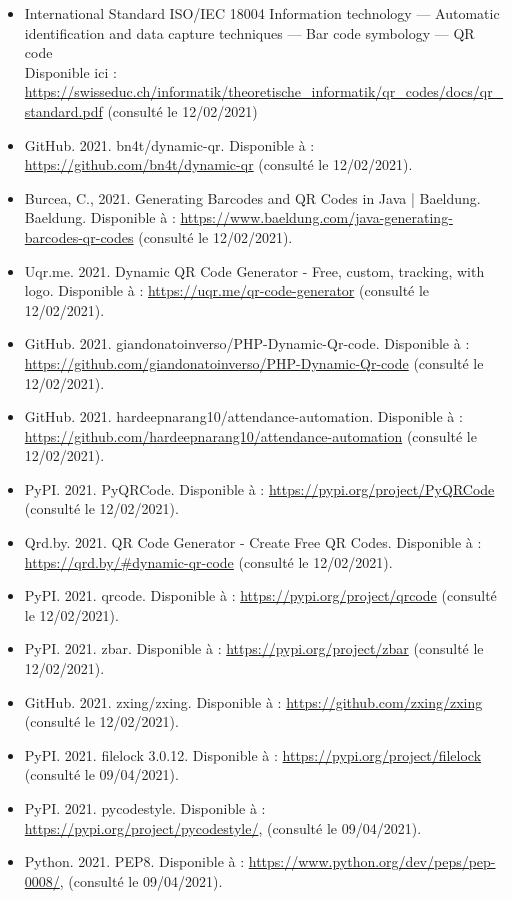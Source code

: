 \documentclass[a4paper,12pt]{article}
\begin{document}
\begin{itemize}

\item International Standard ISO/IEC 18004
Information technology — Automatic identification and data capture techniques — Bar code symbology — QR code\\
Disponible ici : \url{https://swisseduc.ch/informatik/theoretische\_informatik/qr\_codes/docs/qr\_standard.pdf} (consulté le 12/02/2021) \\

\item GitHub. 2021. bn4t/dynamic-qr. Disponible à : \url{https://github.com/bn4t/dynamic-qr} (consulté le 12/02/2021).\\
\item Burcea, C., 2021. Generating Barcodes and QR Codes in Java | Baeldung. Baeldung. Disponible à : \url{https://www.baeldung.com/java-generating-barcodes-qr-codes} (consulté le 12/02/2021).\\
\item Uqr.me. 2021. Dynamic QR Code Generator - Free, custom, tracking, with logo. Disponible à : \url{https://uqr.me/qr-code-generator} (consulté le 12/02/2021).\\
\item GitHub. 2021. giandonatoinverso/PHP-Dynamic-Qr-code. Disponible à : \url{https://github.com/giandonatoinverso/PHP-Dynamic-Qr-code} (consulté le 12/02/2021).\\
\item GitHub. 2021. hardeepnarang10/attendance-automation. Disponible à : \url{https://github.com/hardeepnarang10/attendance-automation} (consulté le 12/02/2021).\\
\item PyPI. 2021. PyQRCode. Disponible à : \url{https://pypi.org/project/PyQRCode} (consulté le 12/02/2021).\\
\item Qrd.by. 2021. QR Code Generator - Create Free QR Codes. Disponible à : \url{https://qrd.by/#dynamic-qr-code} (consulté le 12/02/2021).\\
\item PyPI. 2021. qrcode. Disponible à : \url{https://pypi.org/project/qrcode} (consulté le 12/02/2021).\\
\item PyPI. 2021. zbar. Disponible à : \url{https://pypi.org/project/zbar} (consulté le 12/02/2021).\\
\item GitHub. 2021. zxing/zxing. Disponible à : \url{https://github.com/zxing/zxing} (consulté le 12/02/2021).\\
\item PyPI. 2021. filelock 3.0.12. Disponible à : \url{https://pypi.org/project/filelock} (consulté le 09/04/2021).\\
\item PyPI. 2021. pycodestyle. Disponible à : \url{https://pypi.org/project/pycodestyle/}, (consulté le 09/04/2021).\\
\item Python. 2021. PEP8. Disponible à : \url{https://www.python.org/dev/peps/pep-0008/}, (consulté le 09/04/2021).


\end{itemize}
\end{document}
